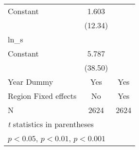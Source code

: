{\begin{longtable}{l*{2}{c}}
Constant            &       1.603\sym{***}&                     \\
                    &     (12.34)         &                     \\
\hline
ln\_s                &                     &                     \\
Constant            &       5.787\sym{***}&                     \\
                    &     (38.50)         &                     \\
[1em]
Year Dummy          &         Yes         &         Yes         \\
\hline
Region Fixed effects&          No         &         Yes         \\
N                   &        2624         &        2624         \\
\hline\hline
\multicolumn{3}{l}{\footnotesize \textit{t} statistics in parentheses}\\
\multicolumn{3}{l}{\footnotesize \sym{*} \(p<0.05\), \sym{**} \(p<0.01\), \sym{***} \(p<0.001\)}\\
\end{longtable}
}
